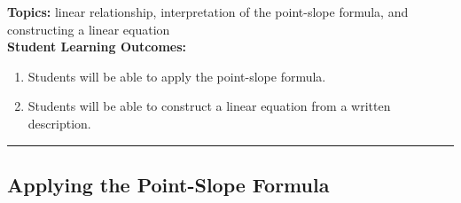 

\noindent \textbf{Topics:}  linear relationship, interpretation of the point-slope formula, and constructing a linear equation\\

\noindent \textbf{Student Learning Outcomes:}
\begin{enumerate}
\item Students will be able to apply the point-slope formula.
\item Students will be able to construct a linear equation from a written description.

\end{enumerate}

\hrule 

\bigskip

\subsection{Applying the Point-Slope Formula} ~

\noindent
{}


